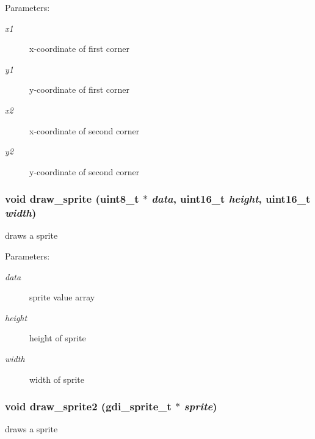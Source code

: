 \begin{Desc}
\item[Parameters:]
\begin{description}
\item[{\em x1}]x-coordinate of first corner \item[{\em y1}]y-coordinate of first corner \item[{\em x2}]x-coordinate of second corner \item[{\em y2}]y-coordinate of second corner \end{description}
\end{Desc}
\hypertarget{group__hgdi__api_g4d61525496e856403881088f723791c8}{
\subsubsection[{draw\_\-sprite}]{\setlength{\rightskip}{0pt plus 5cm}void draw\_\-sprite (uint8\_\-t $\ast$ {\em data}, \/  uint16\_\-t {\em height}, \/  uint16\_\-t {\em width})}}
\label{group__hgdi__api_g4d61525496e856403881088f723791c8}


draws a sprite 

\begin{Desc}
\item[Parameters:]
\begin{description}
\item[{\em data}]sprite value array \item[{\em height}]height of sprite \item[{\em width}]width of sprite \end{description}
\end{Desc}
\hypertarget{group__hgdi__api_ge78bbfb934b7a4443bdebd86508c246b}{
\subsubsection[{draw\_\-sprite2}]{\setlength{\rightskip}{0pt plus 5cm}void draw\_\-sprite2 ({\bf gdi\_\-sprite\_\-t} $\ast$ {\em sprite})}}
\label{group__hgdi__api_ge78bbfb934b7a4443bdebd86508c246b}


draws a sprite 

